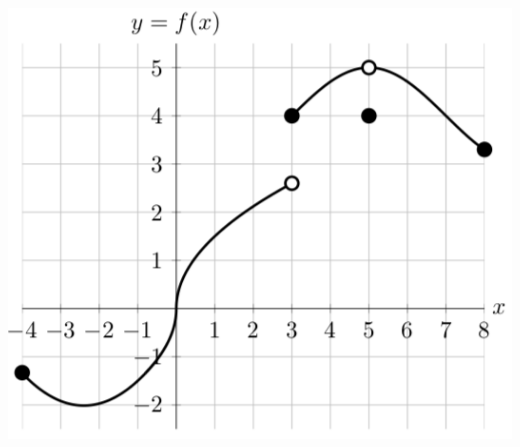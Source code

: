 \documentclass[11pt]{exam}
\begin{document}
\begin{questions}
\begin{center}
  \includegraphics[scale=0.4]{Exam2W2018Problem5}
\end{center}


\end{questions}
\end{document}
